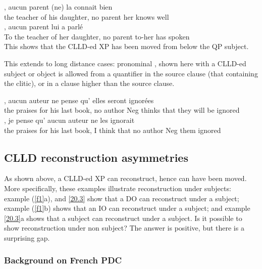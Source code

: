 \documentclass[output=paper]{langsci/langscibook}
\begin{document}
\ea \label{f1}
\ea
	,  aucun parent  (ne) la 	connait bien \\
    {} the teacher of his daughter, no parent \hphantom{(}\Neg{} her knows well\\
\ex
	,  aucun parent 	lui 	a parl\'{e} \\
    {} To the teacher of her daughter, no parent to-her has spoken\\
\z
\z
%
This shows that the \gls{CLLD}-ed XP has been moved from below the QP subject.

This extends to long distance cases: pronominal , shown here with a
\gls{CLLD}-ed subject or object is allowed from a quantifier in the source
clause (that containing the clitic), or in a clause higher  than the source
clause.

\ea \label{20.3}
\ea
{},
aucun auteur ne     pense     qu'    elles  seront  ignor\'{e}es\\
    {} the    praises       for  his    last      book,     no       author  Neg  thinks    that   they   {will be} ignored\\
\ex {},     je pense     qu'    aucun auteur ne  les  ignorait\\
    {}  the    praises       for  his    last      book,     I  think    that   no author Neg them ignored\\
\z
\z
%
\subsection{CLLD reconstruction asymmetries}

As shown above, a \gls{CLLD}-ed XP can reconstruct, hence can have been moved.
More specifically, these examples illustrate reconstruction under subjects:
example (\ref{f1}a), and \eqref{20.3} show that a DO can reconstruct under a subject;
example (\ref{f1}b) shows that an IO can reconstruct under a subject; and example
\ref{20.3}a shows that a subject can reconstruct under a subject.  Is it possible
to show reconstruction under non subject? The answer is positive, but there is
a surprising gap.

\subsubsection{Background on French PDC}
\end{document}
